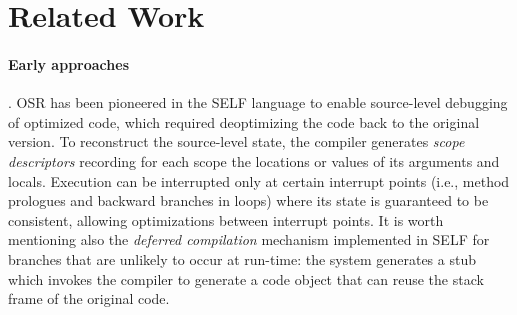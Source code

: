 \section{Related Work}
\label{se:related}

\paragraph{Early approaches}. OSR has been pioneered in the SELF language\cite{holzle1992self} to enable source-level debugging of optimized code, which required deoptimizing the code back to the original version. To reconstruct the source-level state, the compiler generates {\em scope descriptors} recording for each scope the locations or values of its arguments and locals. Execution can be interrupted only at certain interrupt points (i.e., method prologues and backward branches in loops) where its state is guaranteed to be consistent, allowing optimizations between interrupt points. It is worth mentioning also the {\em deferred compilation} mechanism\cite{chambers1991self} implemented in SELF for branches that are unlikely to occur at run-time: the system generates a stub which invokes the compiler to generate a code object that can reuse the stack frame of the original code.

\cite{fink2003design,detlefs2001method, soman2006efficient, lameed2013modular,steiner2007adaptive,chambers1992design}

  
  
  
  
  